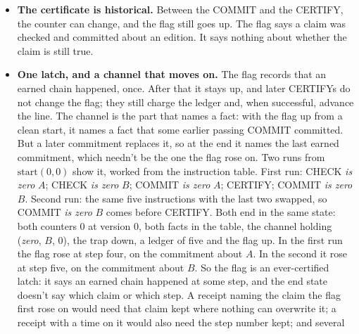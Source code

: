 \documentclass[11pt,twoside]{article}
\theoremstyle{thielethm}
\theoremstyle{thieledef}
\theoremstyle{thieledef}
\theoremstyle{thieledef}
\theoremstyle{thielethm}
\theoremstyle{thieleobs}
\theoremstyle{thielethm}
\begin{document}
\begin{itemize}
of the three original properties. For sorted lists, decode 0 as the empty list and
$2^h(2t+1)$ as the list with head $h$ and tail decoded from $t$.
Every positive code has $t$ smaller than itself, so decoding terminates. The checker
returns yes on an empty list or singleton, and on $a,b,\ldots$ exactly when $a\le b$
and it returns yes on $b,\ldots$. Induction on the list proves that this is exactly
adjacent nondecreasing order. The provenance proof uses only equality of properties, and soundness only that the checker's yes means the property holds, so the same instruction-by-instruction argument applies. What makes that a check of
the list is the proof that the checker means sortedness. Without that proof, ``sorted'' would be a number
some unconstrained code wrote into a counter, and the record would be honest about the counter
and silent about the list.
\item \textbf{The certificate is historical.} Between the COMMIT and the CERTIFY, the counter can
change, and the flag still goes up. The flag says a claim was checked and committed about
an edition. It says nothing about whether the claim is still true.
\item \textbf{One latch, and a channel that moves on.} The flag records that an earned chain
happened, once. After that it stays up, and later CERTIFYs do not change the flag; they still charge the ledger and, when successful, advance the line. The channel is the
part that names a fact: with the flag up from a clean start, it names a fact that some earlier
passing COMMIT committed. But a later commitment replaces it, so at the end
it names the last earned commitment, which needn't be the one the flag rose on. Two runs from
$\mathrm{start}(0, 0)$ show it, worked from the instruction table. First run: CHECK \emph{is zero}
$A$; CHECK \emph{is zero} $B$; COMMIT \emph{is zero} $A$; CERTIFY; COMMIT \emph{is zero} $B$.
Second run: the same five instructions with the last two swapped, so COMMIT \emph{is zero} $B$
comes before CERTIFY. Both end in the same state: both counters 0 at version 0, both facts in the
table, the channel holding (\emph{zero}, $B$, 0), the trap down, a ledger of five and the flag
up. In the first run the flag rose at step four, on the commitment about $A$. In the second it
rose at step five, on the commitment about $B$. So the flag is an ever-certified latch: it says
an earned chain happened at some step, and the end state doesn't say which claim or which step.
A receipt naming the claim the flag first rose on would need that claim kept where nothing can
overwrite it; a receipt with a time on it would also need the step number kept; and several

\end{itemize}
\end{document}
